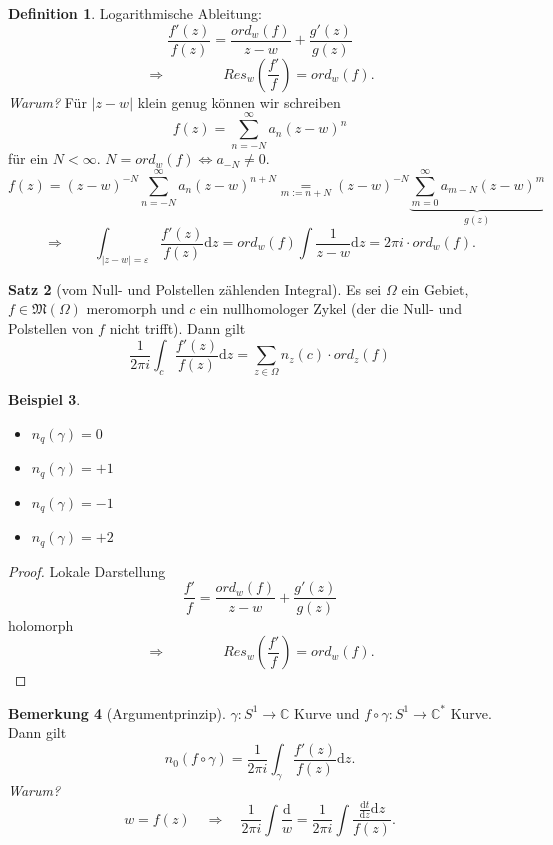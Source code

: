 \documentclass[11pt,titlepage]{article}
\theoremstyle{definition}
\newtheorem{theorem}{Satz}[section]
\newtheorem{definition}[theorem]{Definition}
\newtheorem{example}[theorem]{Beispiel}
\newtheorem{remark}[theorem]{Bemerkung}
\theoremstyle{remark}
\begin{document}
	\begin{definition}
		Logarithmische Ableitung:
		\[ \frac{f'(z)}{f(z)}=\frac{ord_w(f)}{z-w}+\frac{g'(z)}{g(z)} \]
		\[ \Rightarrow \qquad \qquad Res_w\left(\frac{f'}{f}\right)=ord_w(f). \]
		\textsl{Warum?} Für $|z-w|$ klein genug können wir schreiben
		\[ f(z)=\sum_{n=-N}^{\infty} a_n(z-w)^n \]
		für ein $N<\infty$. $N=ord_w(f) \Leftrightarrow a_{-N}\neq 0$.
		\[ f(z)=(z-w)^{-N}\sum_{n=-N}^{\infty} a_n(z-w)^{n+N} \underset{m:=n+N}{=}
		(z-w)^{-N} \underbrace{\sum_{m=0}^{\infty}a_{m-N}	(z-w)^m}_{g(z)}	\]
		\[ \Rightarrow \qquad \int_{|z-w|=\varepsilon} \frac{f'(z)}{f(z)} \mathrm{d}z =
		ord_w(f) \int \frac{1}{z-w}\mathrm{d}z =2\pi i \cdot ord_w(f). \]
	\end{definition}
	
	\begin{theorem}[vom Null- und Polstellen zählenden Integral]
		Es sei $\Omega$ ein Gebiet, $f\in\mathfrak{M}(\Omega)$ meromorph und $c$ ein nullhomologer 
		Zykel (der die Null- und Polstellen von $f$ nicht trifft). Dann gilt
		\[ \frac{1}{2\pi i} \int_c \frac{f'(z)}{f(z)}\mathrm{d}z =\sum_{z\in\Omega} n_z(c)\cdot ord_z(f) \]
	\end{theorem}
	
	\begin{example}
		\begin{itemize}
			\item $n_q(\gamma)=0$
			
			\item $n_q(\gamma)=+1$
			
			\item $n_q(\gamma)=-1$
			
			\item $n_q(\gamma)=+2$
		\end{itemize}
	\end{example}
	
	\begin{proof}
		Lokale Darstellung
		\[ \frac{f'}{f} =\frac{ord_w(f)}{z-w}+\frac{g'(z)}{g(z)} \]
		holomorph
		\[ \Rightarrow \qquad \qquad Res_w\left(\frac{f'}{f}\right)=ord_w(f).\]
	\end{proof}
	
	\begin{remark}[Argumentprinzip]
		$\gamma:S^1\to\mathbb{C}$ Kurve und $f\circ\gamma:S^1\to\mathbb{C}^*$ Kurve. Dann gilt
		\[ n_0(f\circ \gamma)=\frac{1}{2\pi i}\int_{\gamma} \frac{f'(z)}{f(z)}\mathrm{d}z. \]
		\textsl{Warum?}
		\[ w =f(z) \quad \Rightarrow \quad \frac{1}{2\pi i} \int \frac{\mathrm{d}}{w}=\frac{1}{2\pi i} 
		\int \frac{\frac{\mathrm{d}t}{\mathrm{d}z} \mathrm{d}z}{f(z)}.\]
	\end{remark}
	
\end{document}

